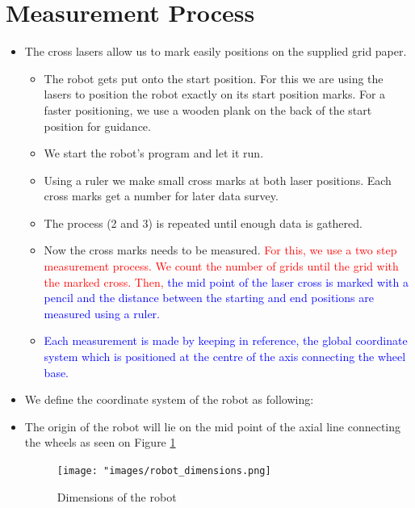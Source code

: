     \section{Measurement Process}
        \begin{itemize}
            \item The cross lasers allow us to mark easily positions on the supplied grid paper.
            
            \begin{itemize}
                \item [1.]	
            The robot gets put onto the start position. For this we are using the lasers to position the robot exactly on its start position marks. For a faster positioning, we use a wooden plank on the back of the start position for guidance. 
            \item [2.] We start the robot's program and let it run.
            \item [3.] Using a ruler we make small cross marks at both laser positions. Each cross marks get a number for later data survey.
            \item [4.] The process (2 and 3) is repeated until enough data is gathered.
            \item [5.] Now the cross marks needs to be measured. \textcolor{red}{For this, we use a two step measurement process. We count the number of grids until the grid with the marked cross. Then, }\textcolor{blue}{the mid point of the laser cross is marked with a pencil and the distance between the starting and end positions are measured using  a ruler.}
            \item[6.] \textcolor{blue}{Each measurement is made by keeping in reference, the global coordinate system which is positioned at the centre of the axis connecting the wheel base.}
            \end{itemize}
            
            \item  We define the coordinate system of the robot as following: 
            \item The origin of the robot will lie on the mid point of the axial line connecting the wheels as seen on Figure \ref{fig:Dimensions of the robot} 
            
            \begin{figure}[!ht] 
                        \centering \texttt{[image: "images/robot\_dimensions.png]}
                        \caption{Dimensions of the robot}
                        \label{fig:Dimensions of the robot}
                 \end{figure}
            

\end{itemize}
